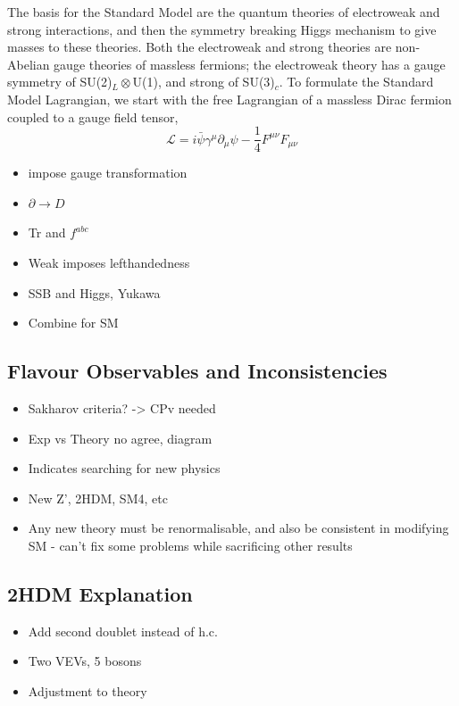 \documentclass[a4paper,12pt]{article}
\begin{document}
The basis for the Standard Model are the quantum theories of electroweak and strong interactions, and then the symmetry breaking Higgs mechanism to give masses to these theories.
Both the electroweak and strong theories are non-Abelian gauge theories of massless fermions; the electroweak theory has a gauge symmetry of SU(2)$_{L}\otimes$U(1), and strong of SU(3)$_{c}$.
To formulate the Standard Model Lagrangian, we start with the free Lagrangian of a massless Dirac fermion coupled to a gauge field tensor,
\begin{equation}
    \label{eq:dirac}
    \mathcal{L} = i\bar{\psi}\gamma^\mu\partial_\mu\psi - \frac14F^{\mu\nu}F_{\mu\nu}
\end{equation}
\begin{itemize}
    \item impose gauge transformation
    \item $\partial\to D$
    \item Tr and $f^{abc}$
    \item Weak imposes lefthandedness
    \item SSB and Higgs, Yukawa
    \item Combine for SM
\end{itemize}

\subsection{Flavour Observables and Inconsistencies}
\begin{itemize}
    \item Sakharov criteria? -> CPv needed
    \item Exp vs Theory no agree, diagram
    \item Indicates searching for new physics
    \item New Z', 2HDM, SM4, etc
    \item Any new theory must be renormalisable, and also be consistent in modifying SM - can't fix some problems while sacrificing other results
\end{itemize}

\subsection{2HDM Explanation}
\begin{itemize}
    \item Add second doublet instead of h.c.
    \item Two VEVs, 5 bosons
    \item Adjustment to theory
\end{itemize}
\end{document}
